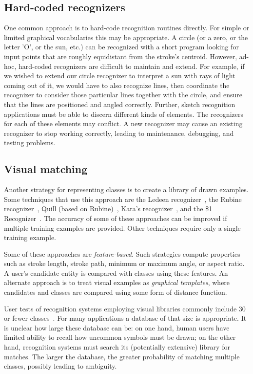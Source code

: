 \subsection{Hard-coded recognizers}

One common approach is to hard-code recognition routines directly. For
simple or limited graphical vocabularies this may be appropriate. A
circle (or a zero, or the letter 'O', or the sun, etc.)  can be
recognized with a short program looking for input points that are
roughly equidistant from the stroke's centroid. However, ad-hoc,
hard-coded recognizers are difficult to maintain and extend. For
example, if we wished to extend our circle recognizer to interpret a
sun with rays of light coming out of it, we would have to also
recognize lines, then coordinate the recognizer to consider those
particular lines together with the circle, and ensure that the lines
are positioned and angled correctly. Further, sketch recognition
applications must be able to discern different kinds of elements. The
recognizers for each of these elements may conflict. A new recognizer
may cause an existing recognizer to stop working correctly, leading to
maintenance, debugging, and testing problems.

\subsection{Visual matching}
\label{recognition-library}

Another strategy for representing classes is to create a library of
drawn examples. Some techniques that use this approach are the Ledeen
recognizer~\cite{newman-sproull-graphics-2}, the Rubine
recognizer~\cite{rubine-recognizer}, Quill (based on
Rubine)~\cite{long-quill-chi}, Kara's
recognizer~\cite{kara-recognizer-cg}, and the \$1
Recognizer~\cite{wobbrock-dollar}. The accuracy of some of these
approaches can be improved if multiple training examples are
provided. Other techniques require only a single training example.

Some of these approaches are \textit{feature-based}. Such strategies
compute properties such as stroke length, stroke path, minimum or
maximum angle, or aspect ratio. A user's candidate entity is compared
with classes using these features. An alternate approach is to treat
visual examples as \textit{graphical templates}, where candidates and
classes are compared using some form of distance function.

User tests of recognition systems employing visual libraries commonly
include 30 or fewer classes~\cite[page 13]{kara-recognizer-cg}. For
many applications a database of that size is appropriate. It is
unclear how large these database can be: on one hand, human users have
limited ability to recall how uncommon symbols must be drawn; on the
other hand, recognition systems must search its (potentially
extensive) library for matches. The larger the database, the greater
probability of matching multiple classes, possibly leading to
ambiguity.


